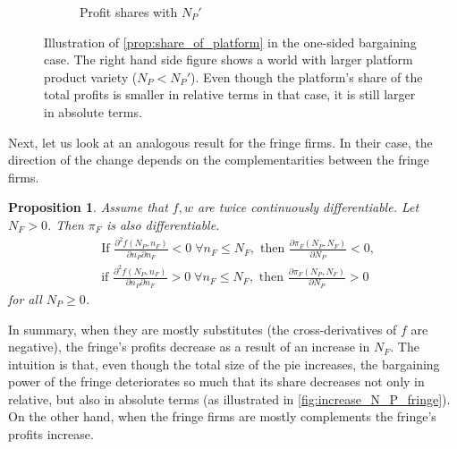 \documentclass[a4paper]{article}
\newtheorem{proposition}{Proposition}
\begin{document}
\begin{figure}[ht]
\begin{subfigure}[b]{0.45\textwidth}
        \caption{Profit shares with $N_P'$}
    \end{subfigure}
    \caption{Illustration of \cref{prop:share_of_platform} in the one-sided bargaining case. The right hand side figure shows a world with larger platform product variety ($N_P < N_P'$). Even though the platform's share of the total profits is smaller in relative terms in that case, it is still larger in absolute terms.}
    \label{fig:increase_N_P_platform}
\end{figure}

Next, let us look at an analogous result for the fringe firms.
In their case, the direction of the change depends on the complementarities between the fringe firms.
\begin{proposition}
    \label{prop:share_of_fringe}
    Assume that $f, w$ are twice continuously differentiable.
    Let $N_F > 0$.
    Then $\pi_F$ is also differentiable.
    \begin{align*}
        &\text{If } \frac{\partial^2 f(N_P, n_F)}{\partial n_P \partial n_F} < 0 \;\forall n_F \leq N_F, \text{ then } \frac{\partial \pi_F(N_P, N_F)}{\partial N_P} < 0, \\
        &\text{if } \frac{\partial^2 f(N_P, n_F)}{\partial n_P \partial n_F} > 0 \;\forall n_F \leq N_F, \text{ then } \frac{\partial \pi_F(N_P, N_F)}{\partial N_P} > 0
    \end{align*}
    for all $N_P \geq 0$.
\end{proposition}
In summary, when they are mostly substitutes (the cross-derivatives of $f$ are negative), the fringe's profits decrease as a result of an increase in $N_F$.
The intuition is that, even though the total size of the pie increases, the bargaining power of the fringe deteriorates so much that its share decreases not only in relative, but also in absolute terms (as illustrated in \cref{fig:increase_N_P_fringe}).
On the other hand, when the fringe firms are mostly complements the fringe's profits increase.
\end{document}
